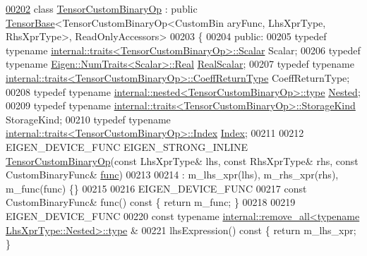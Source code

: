 \begin{DoxyCode}
\hyperlink{class_eigen_1_1_tensor_custom_binary_op}{00202} \textcolor{keyword}{class }\hyperlink{class_eigen_1_1_tensor_custom_binary_op}{TensorCustomBinaryOp} : \textcolor{keyword}{public} \hyperlink{class_eigen_1_1_tensor_base}{TensorBase}<TensorCustomBinaryOp<CustomBin
      aryFunc, LhsXprType, RhsXprType>, ReadOnlyAccessors>
00203 \{
00204   \textcolor{keyword}{public}:
00205   \textcolor{keyword}{typedef} \textcolor{keyword}{typename} \hyperlink{struct_eigen_1_1internal_1_1traits}{internal::traits<TensorCustomBinaryOp>::Scalar}
       Scalar;
00206   \textcolor{keyword}{typedef} \textcolor{keyword}{typename} \hyperlink{group___sparse_core___module}{Eigen::NumTraits<Scalar>::Real} 
      \hyperlink{group___sparse_core___module}{RealScalar};
00207   \textcolor{keyword}{typedef} \textcolor{keyword}{typename} \hyperlink{struct_eigen_1_1internal_1_1traits}{internal::traits<TensorCustomBinaryOp>::CoeffReturnType}
       CoeffReturnType;
00208   \textcolor{keyword}{typedef} \textcolor{keyword}{typename} \hyperlink{class_eigen_1_1internal_1_1_tensor_lazy_evaluator_writable}{internal::nested<TensorCustomBinaryOp>::type}
       \hyperlink{class_eigen_1_1internal_1_1_tensor_lazy_evaluator_writable}{Nested};
00209   \textcolor{keyword}{typedef} \textcolor{keyword}{typename} \hyperlink{struct_eigen_1_1internal_1_1traits}{internal::traits<TensorCustomBinaryOp>::StorageKind}
       StorageKind;
00210   \textcolor{keyword}{typedef} \textcolor{keyword}{typename} \hyperlink{struct_eigen_1_1internal_1_1traits}{internal::traits<TensorCustomBinaryOp>::Index}
       \hyperlink{namespace_eigen_a62e77e0933482dafde8fe197d9a2cfde}{Index};
00211 
00212   EIGEN\_DEVICE\_FUNC EIGEN\_STRONG\_INLINE \hyperlink{class_eigen_1_1_tensor_custom_binary_op}{TensorCustomBinaryOp}(\textcolor{keyword}{const} LhsXprType& lhs, \textcolor{keyword}{
      const} RhsXprType& rhs, \textcolor{keyword}{const} CustomBinaryFunc& \hyperlink{structfunc}{func})
00213 
00214       : m\_lhs\_xpr(lhs), m\_rhs\_xpr(rhs), m\_func(func) \{\}
00215 
00216   EIGEN\_DEVICE\_FUNC
00217   \textcolor{keyword}{const} CustomBinaryFunc& func()\textcolor{keyword}{ const }\{ \textcolor{keywordflow}{return} m\_func; \}
00218 
00219   EIGEN\_DEVICE\_FUNC
00220   \textcolor{keyword}{const} \textcolor{keyword}{typename} \hyperlink{group___sparse_core___module}{internal::remove\_all<typename LhsXprType::Nested>::type}
      &
00221   lhsExpression()\textcolor{keyword}{ const }\{ \textcolor{keywordflow}{return} m\_lhs\_xpr; \}

\end{DoxyCode}
